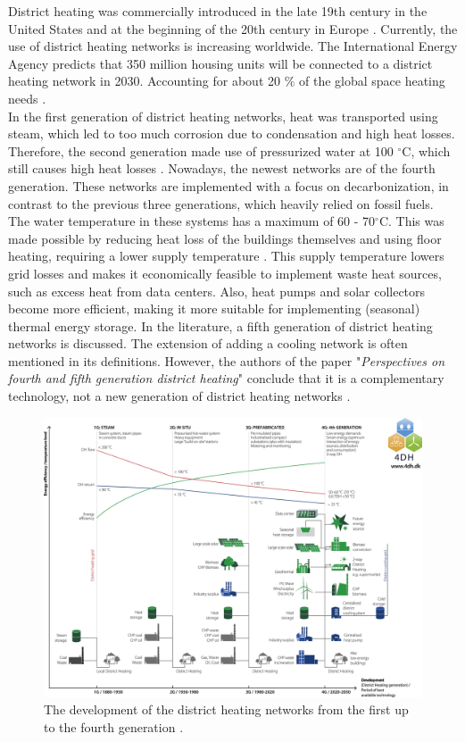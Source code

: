 District heating was commercially introduced in the late 19th century in the United States and at the beginning of the 20th century in Europe \cite{bookMax}. Currently, the use of district heating networks is increasing worldwide. The International Energy Agency predicts that 350 million housing units will be connected to a district heating network in 2030. Accounting for about 20 $\%$ of the global space heating needs \cite{IEAheating}. \\

In the first generation of district heating networks, heat was transported using steam, which led to too much corrosion due to condensation and high heat losses. Therefore, the second generation made use of pressurized water at 100 $^{\circ}\text{C}$, which still causes high heat losses \cite{FemkeJanssenLit}. Nowadays, the newest networks are of the fourth generation. These networks are implemented with a focus on decarbonization, in contrast to the previous three generations, which heavily relied on fossil fuels. The water temperature in these systems has a maximum of 60 - 70$^{\circ}\text{C}$. This was made possible by reducing heat loss of the buildings themselves and using floor heating, requiring a lower supply temperature \cite{FemkeJanssenLit}. This supply temperature lowers grid losses and makes it economically feasible to implement waste heat sources, such as excess heat from data centers. Also, heat pumps and solar collectors become more efficient, making it more suitable for implementing (seasonal) thermal energy storage. In the literature, a fifth generation of district heating networks is discussed. The extension of adding a cooling network is often mentioned in its definitions. However, the authors of the paper "\textit{Perspectives on fourth and fifth generation district heating}" conclude that it is a complementary technology, not a new generation of district heating networks \cite{4GDH5GDH}. 

\begin{figure}[h]
    \centering
    \includegraphics[width=\linewidth]{figuresLIT/GDH.jpg}
    \caption{The development of the district heating networks from the first up to the fourth generation \cite{4GDH5GDH}.}
    \label{fig:devDHN}
\end{figure}

